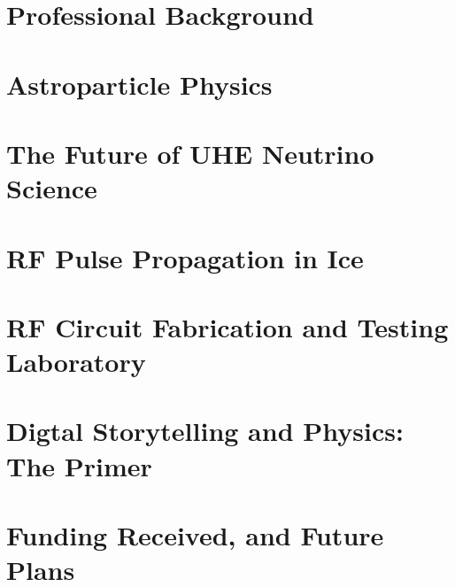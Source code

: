 \documentclass[../main.tex]{subfiles}
\begin{document}
\section{Professional Background}

\begin{flushleft}

\end{flushleft}

\section{Astroparticle Physics}

\begin{flushleft}

\end{flushleft}

\section{The Future of UHE Neutrino Science}

\begin{flushleft}

\end{flushleft}

\section{RF Pulse Propagation in Ice}

\begin{flushleft}

\end{flushleft}

\section{RF Circuit Fabrication and Testing Laboratory}
\label{sec:schol}

\begin{flushleft}

\end{flushleft}

\section{Digtal Storytelling and Physics: The Primer}

\begin{flushleft}

\end{flushleft}

\section{Funding Received, and Future Plans}

\begin{flushleft}

\end{flushleft}
\end{document}
